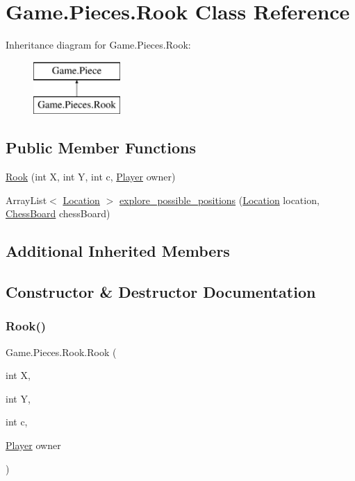 \hypertarget{class_game_1_1_pieces_1_1_rook}{}\section{Game.\+Pieces.\+Rook Class Reference}
\label{class_game_1_1_pieces_1_1_rook}
Inheritance diagram for Game.\+Pieces.\+Rook\+:\begin{figure}[H]
\begin{center}
\leavevmode
\includegraphics[height=2.000000cm]{class_game_1_1_pieces_1_1_rook}
\end{center}
\end{figure}
\subsection*{Public Member Functions}
\begin{DoxyCompactItemize}
\item 
\hyperlink{class_game_1_1_pieces_1_1_rook_a30976d18bff9d0dae46e7b5edd89eaaf}{Rook} (int X, int Y, int c, \hyperlink{class_game_1_1_player}{Player} owner)
\item 
Array\+List$<$ \hyperlink{class_game_1_1_location}{Location} $>$ \hyperlink{class_game_1_1_pieces_1_1_rook_a624cb321b47a960b392211b3da8d0b7c}{explore\+\_\+possible\+\_\+positions} (\hyperlink{class_game_1_1_location}{Location} location, \hyperlink{class_game_1_1_chess_board}{Chess\+Board} chess\+Board)
\end{DoxyCompactItemize}
\subsection*{Additional Inherited Members}


\subsection{Constructor \& Destructor Documentation}
\mbox{\label{class_game_1_1_pieces_1_1_rook_a30976d18bff9d0dae46e7b5edd89eaaf}} 
\subsubsection{\texorpdfstring{Rook()}{Rook()}}
{\footnotesize\ttfamily Game.\+Pieces.\+Rook.\+Rook (\begin{DoxyParamCaption}\item[{int}]{X,  }\item[{int}]{Y,  }\item[{int}]{c,  }\item[{\hyperlink{class_game_1_1_player}{Player}}]{owner }\end{DoxyParamCaption})\hspace{0.3cm}{\ttfamily [inline]}}

